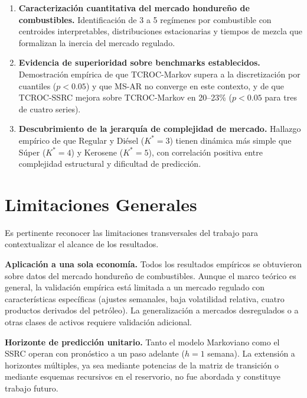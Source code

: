 \begin{enumerate}
    \item \textbf{Caracterización cuantitativa del mercado hondureño
    de combustibles.}  Identificación de 3 a 5 regímenes por
    combustible con centroides interpretables, distribuciones
    estacionarias y tiempos de mezcla que formalizan la inercia del
    mercado regulado.

    \item \textbf{Evidencia de superioridad sobre benchmarks
    establecidos.}  Demostración empírica de que TCROC-Markov supera
    a la discretización por cuantiles ($p < 0.05$) y que MS-AR no
    converge en este contexto, y de que TCROC-SSRC mejora sobre
    TCROC-Markov en 20--23\% ($p < 0.05$ para tres de cuatro
    series).

    \item \textbf{Descubrimiento de la jerarquía de complejidad de
    mercado.}  Hallazgo empírico de que Regular y Diésel ($K^* = 3$)
    tienen dinámica más simple que Súper ($K^* = 4$) y Kerosene
    ($K^* = 5$), con correlación positiva entre complejidad
    estructural y dificultad de predicción.
\end{enumerate}

\section{Limitaciones Generales}
\label{sec:limitaciones_generales}

Es pertinente reconocer las limitaciones transversales del trabajo
para contextualizar el alcance de los resultados.

\textbf{Aplicación a una sola economía.}  Todos los resultados
empíricos se obtuvieron sobre datos del mercado hondureño de
combustibles.  Aunque el marco teórico es general, la validación
empírica está limitada a un mercado regulado con características
específicas (ajustes semanales, baja volatilidad relativa, cuatro
productos derivados del petróleo).  La generalización a mercados
desregulados o a otras clases de activos requiere validación
adicional.

\textbf{Horizonte de predicción unitario.}  Tanto el modelo
Markoviano como el SSRC operan con pronóstico a un paso adelante
($h = 1$ semana).  La extensión a horizontes múltiples, ya sea
mediante potencias de la matriz de transición o mediante esquemas
recursivos en el reservorio, no fue abordada y constituye trabajo
futuro.

